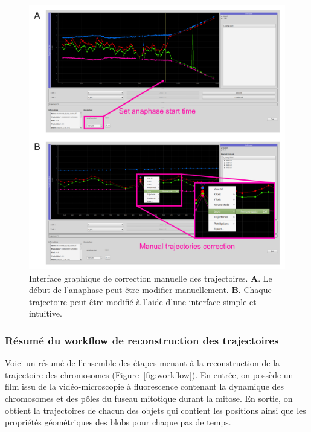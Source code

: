 \documentclass[12pt,a4paper,twoside,openright]{book}
\begin{document}
\begin{figure}[htbp]
\centering
\includegraphics{figures/results/imaging/gui.png}
\caption{\label{fig:gui}Interface graphique de correction manuelle des
trajectoires. \textbf{A}. Le début de l'anaphase peut être modifier
manuellement. \textbf{B}. Chaque trajectoire peut être modifié à l'aide
d'une interface simple et intuitive.}
\end{figure}

\subsubsection{Résumé du workflow de reconstruction des
trajectoires}\label{ruxe9sumuxe9-du-workflow-de-reconstruction-des-trajectoires}

Voici un résumé de l'ensemble des étapes menant à la reconstruction de
la trajectoire des chromosomes (Figure~\ref{fig:workflow}). En entrée,
on possède un film issu de la vidéo-microscopie à fluorescence contenant
la dynamique des chromosomes et des pôles du fuseau mitotique durant la
mitose. En sortie, on obtient la trajectoires de chacun des objets qui
contient les positions ainsi que les propriétés géométriques des blobs
pour chaque pas de temps.
\end{document}
